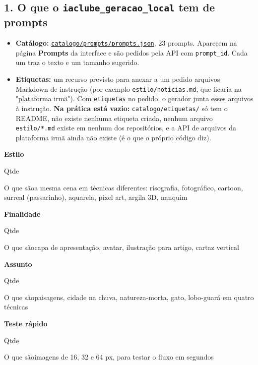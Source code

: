 \subsection*{1. O que o \nolinkurl{iaclube_geracao_local} tem de prompts}

\begin{itemize}
\item 
\textbf{Catálogo:} \href{run:../../../../iaclube_geracao_local/catalogo/prompts/prompts.json}{\nolinkurl{catalogo/prompts/prompts.json}}, 23 prompts. Aparecem na página \textbf{Prompts} da interface e são pedidos pela API com \nolinkurl{prompt_id}. Cada um traz o texto e um tamanho sugerido.


\item 
\textbf{Etiquetas:} um recurso previsto para anexar a um pedido arquivos Markdown de instrução (por exemplo \nolinkurl{estilo/noticias.md}, que ficaria na "plataforma irmã"). Com \texttt{etiquetas} no pedido, o gerador junta esses arquivos à instrução. \textbf{Na prática está vazio:} \nolinkurl{catalogo/etiquetas/} só tem o README, não existe nenhuma etiqueta criada, nenhum arquivo \nolinkurl{estilo/*.md} existe em nenhum dos repositórios, e a API de arquivos da plataforma irmã ainda não existe (é o que o próprio código diz).


\end{itemize}

\begin{recordbox}
{\bfseries\color{accent} Estilo}\par
{\small\color{muted} Qtde}\par
{\small\color{muted} O que são}\quad a mesma cena em técnicas diferentes: risografia, fotográfico, cartoon, surreal (passarinho), aquarela, pixel art, argila 3D, nanquim\par
\end{recordbox}
\begin{recordbox}
{\bfseries\color{accent} Finalidade}\par
{\small\color{muted} Qtde}\par
{\small\color{muted} O que são}\quad capa de apresentação, avatar, ilustração para artigo, cartaz vertical\par
\end{recordbox}
\begin{recordbox}
{\bfseries\color{accent} Assunto}\par
{\small\color{muted} Qtde}\par
{\small\color{muted} O que são}\quad paisagens, cidade na chuva, natureza-morta, gato, lobo-guará em quatro técnicas\par
\end{recordbox}
\begin{recordbox}
{\bfseries\color{accent} Teste rápido}\par
{\small\color{muted} Qtde}\par
{\small\color{muted} O que são}\quad imagens de 16, 32 e 64 px, para testar o fluxo em segundos\par
\end{recordbox}


